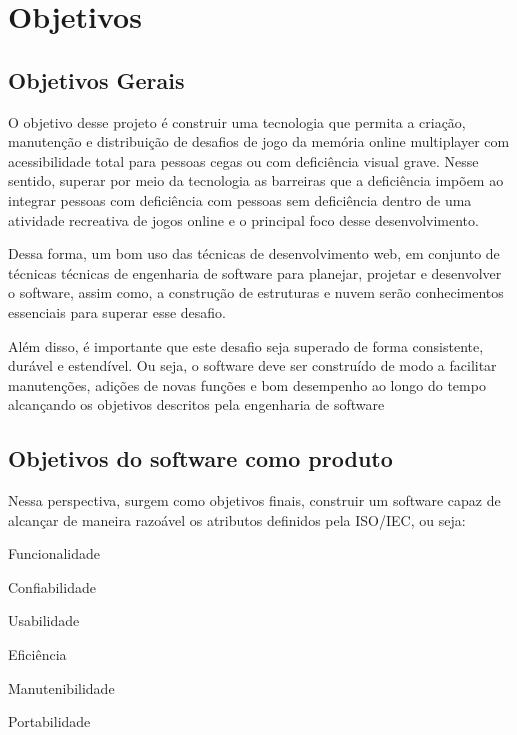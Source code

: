 \chapter{Objetivos}

\label{chap:Objetivos}

\section{Objetivos Gerais}

O objetivo desse projeto é construir uma tecnologia que permita a criação, manutenção e distribuição de desafios de jogo da memória online multiplayer com acessibilidade total para pessoas cegas ou com deficiência visual grave. Nesse sentido, superar por meio da tecnologia as barreiras que a deficiência impõem ao integrar pessoas com deficiência com pessoas sem deficiência dentro de uma atividade recreativa de jogos online e o principal foco desse desenvolvimento.

Dessa forma, um bom uso das técnicas de desenvolvimento web, em conjunto de técnicas técnicas de engenharia de software para planejar, projetar e desenvolver o software, assim como, a construção de estruturas e nuvem serão conhecimentos essenciais para superar esse desafio.

Além disso, é importante que este desafio seja superado de forma consistente, durável e estendível. Ou seja, o software deve ser construído de modo a facilitar manutenções, adições de novas funções e bom desempenho ao longo do tempo alcançando os objetivos descritos pela engenharia de software

\section{Objetivos do software como produto}

Nessa perspectiva, surgem como objetivos finais, construir um software capaz de alcançar de maneira razoável os atributos definidos pela ISO/IEC, ou seja: \cite{ISO/IEC9126}

\begin{alineascomponto}
  \item Funcionalidade
  \item Confiabilidade
  \item Usabilidade
  \item Eficiência
  \item Manutenibilidade
  \item Portabilidade
\end{alineascomponto}
